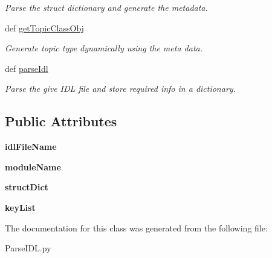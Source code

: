 \begin{DoxyCompactItemize}
\begin{DoxyCompactList}\small\item\em Parse the struct dictionary and generate the metadata. \end{DoxyCompactList}\item 
\hypertarget{classddswrapper_1_1_parse_i_d_l_1_1_parse_i_d_l_aec128128aa39141ccf8c8d3ebb53a67c}{
def \hyperlink{classddswrapper_1_1_parse_i_d_l_1_1_parse_i_d_l_aec128128aa39141ccf8c8d3ebb53a67c}{getTopicClassObj}}
\label{classddswrapper_1_1_parse_i_d_l_1_1_parse_i_d_l_aec128128aa39141ccf8c8d3ebb53a67c}

\begin{DoxyCompactList}\small\item\em Generate topic type dynamically using the meta data. \end{DoxyCompactList}\item 
\hypertarget{classddswrapper_1_1_parse_i_d_l_1_1_parse_i_d_l_aef3224a95040ee0ccde80f714095fdeb}{
def \hyperlink{classddswrapper_1_1_parse_i_d_l_1_1_parse_i_d_l_aef3224a95040ee0ccde80f714095fdeb}{parseIdl}}
\label{classddswrapper_1_1_parse_i_d_l_1_1_parse_i_d_l_aef3224a95040ee0ccde80f714095fdeb}

\begin{DoxyCompactList}\small\item\em Parse the give IDL file and store required info in a dictionary. \end{DoxyCompactList}\end{DoxyCompactItemize}
\subsection*{Public Attributes}
\begin{DoxyCompactItemize}
\item 
\hypertarget{classddswrapper_1_1_parse_i_d_l_1_1_parse_i_d_l_aa29f9905ab88c76844ca54aad2d0ed2a}{
{\bfseries idlFileName}}
\label{classddswrapper_1_1_parse_i_d_l_1_1_parse_i_d_l_aa29f9905ab88c76844ca54aad2d0ed2a}

\item 
\hypertarget{classddswrapper_1_1_parse_i_d_l_1_1_parse_i_d_l_a90632aea8e260d760547612316065f3a}{
{\bfseries moduleName}}
\label{classddswrapper_1_1_parse_i_d_l_1_1_parse_i_d_l_a90632aea8e260d760547612316065f3a}

\item 
\hypertarget{classddswrapper_1_1_parse_i_d_l_1_1_parse_i_d_l_a0721b563acde5cd7d980d9806567a191}{
{\bfseries structDict}}
\label{classddswrapper_1_1_parse_i_d_l_1_1_parse_i_d_l_a0721b563acde5cd7d980d9806567a191}

\item 
\hypertarget{classddswrapper_1_1_parse_i_d_l_1_1_parse_i_d_l_ac848a3a47c216f8251f2edf6f9307f4b}{
{\bfseries keyList}}
\label{classddswrapper_1_1_parse_i_d_l_1_1_parse_i_d_l_ac848a3a47c216f8251f2edf6f9307f4b}

\end{DoxyCompactItemize}


The documentation for this class was generated from the following file:\begin{DoxyCompactItemize}
\item 
ParseIDL.py\end{DoxyCompactItemize}
